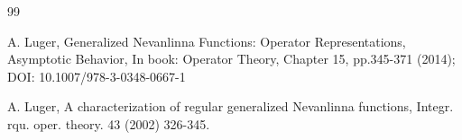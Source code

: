 \documentclass[11pt, reqno]{amsart}
\theoremstyle{plain}
\theoremstyle{remark}
\numberwithin{equation}{section}
\begin{document}
\begin{thebibliography}{99}









 A. Luger, Generalized Nevanlinna Functions: Operator Representations, Asymptotic Behavior, In book: Operator Theory, Chapter 15, pp.345-371 (2014); DOI: 10.1007/978-3-0348-0667-1 

 A. Luger, A characterization of regular generalized Nevanlinna functions, Integr. rqu. oper. theory. 43 (2002) 326-345.




\end{thebibliography}
\end{document}
